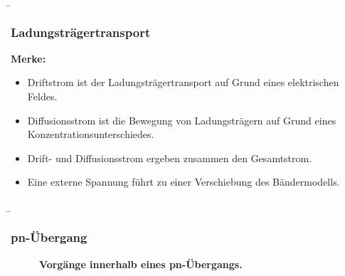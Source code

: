 \begin{frame}
    \b{
    \frametitle{Ladungsträgertransport}
    \textbf{Merke:}
    \begin{itemize}
        \item Driftstrom ist der Ladungsträgertransport auf Grund eines elektrischen Feldes.
        \item Diffusionsstrom ist die Bewegung von Ladungsträgern auf Grund eines Konzentrationsunterschiedes.
        \item Drift- und Diffusionsstrom ergeben zusammen den Gesamtstrom.
        \item Eine externe Spannung führt zu einer Verschiebung des Bändermodells. 
    \end{itemize}}
\end{frame}

\begin{frame}
    \b{
    \frametitle{pn-Übergang}
    \begin{figure}[H]
        \centering
        
        \caption{\textbf{Vorgänge innerhalb eines pn-Übergangs.}}  
    \end{figure}
    }

\end{frame}

